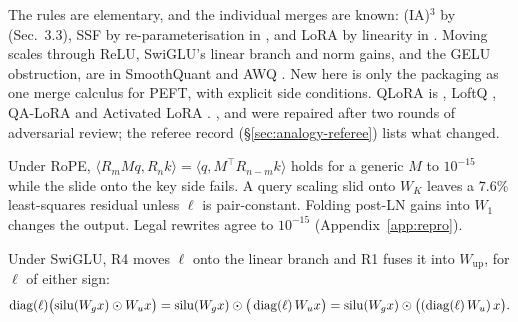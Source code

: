 The rules are elementary, and the individual merges are known: (IA)$^3$ by \citet{liu2022few} (Sec.~3.3), SSF by
re-parameterisation in \citet{lian2022scaling}, and LoRA by linearity in \citet{hu2021lora}. Moving scales through ReLU,
SwiGLU's linear branch and norm gains, and the GELU obstruction, are in SmoothQuant \citep{xxiao2023smoothquant} and AWQ
\citep{xlin2024awq}. New here is only the packaging as one merge calculus for PEFT, with explicit side conditions. QLoRA
is \citet{dettmers2023qlora}, LoftQ \citet{li2023loftq}, QA-LoRA \citet{xu2023qa} and Activated LoRA
\citet{greenewald2025activated}. ,  and  were
repaired after two rounds of adversarial review; the referee record (\S\ref{sec:analogy-referee}) lists what changed.

\noindent{}\enspace Under RoPE, $\langle R_mMq,R_nk\rangle=\langle q,M^\top R_{n-m}k\rangle$ holds for a
generic $M$ to $10^{-15}$ while the slide onto the key side fails. A query scaling slid onto $W_K$ leaves a $7.6\%$
least-squares residual unless $\ell$ is pair-constant. Folding post-LN gains into $W_1$ changes the output. Legal
rewrites agree to $10^{-15}$ (Appendix~\ref{app:repro}).

Under SwiGLU, R4 moves $\ell$ onto the linear branch and R1 fuses it into $W_{\mathrm{up}}$, for $\ell$ of either sign:
\begin{equation}\label{eq:merge-swiglu}
  \diag(\ell)\big(\mathrm{silu}(W_gx)\odot W_ux\big)=\mathrm{silu}(W_gx)\odot\big(\diag(\ell)\,W_ux\big)
  =\mathrm{silu}(W_gx)\odot\big((\diag(\ell)\,W_u)\,x\big).
\end{equation}

